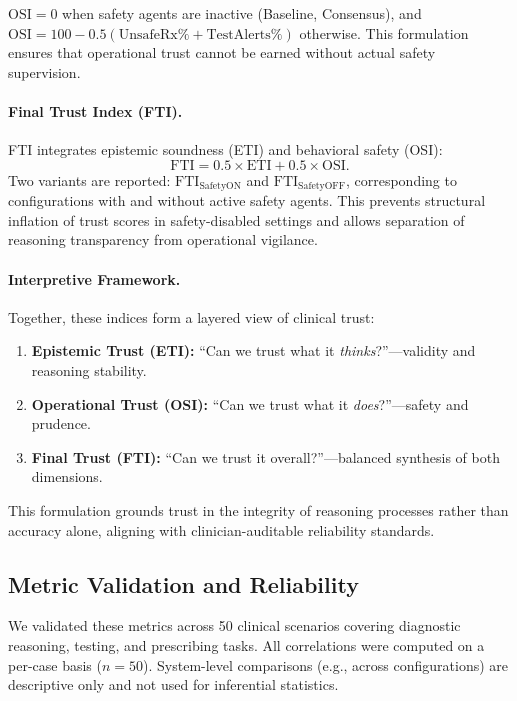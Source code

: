 \documentclass[letterpaper]{article} %
\begin{document}
$\mathrm{OSI}=0$ when safety agents are inactive (Baseline, Consensus),
and $\mathrm{OSI}=100 - 0.5(\text{UnsafeRx\%} + \text{TestAlerts\%})$ otherwise.
This formulation ensures that operational trust cannot be earned without actual safety supervision.


\paragraph{Final Trust Index (FTI).}
FTI integrates epistemic soundness (ETI) and behavioral safety (OSI):
\[
\mathrm{FTI} = 0.5 \times \mathrm{ETI} + 0.5 \times \mathrm{OSI}.
\]
Two variants are reported: $\mathrm{FTI}_{\text{SafetyON}}$ and $\mathrm{FTI}_{\text{SafetyOFF}}$, corresponding to configurations with and without active safety agents. 
This prevents structural inflation of trust scores in safety-disabled settings and allows separation of reasoning transparency from operational vigilance.

\paragraph{Interpretive Framework.}
Together, these indices form a layered view of clinical trust:
\begin{enumerate}
    \item \textbf{Epistemic Trust (ETI):} “Can we trust what it \textit{thinks}?”—validity and reasoning stability.
    \item \textbf{Operational Trust (OSI):} “Can we trust what it \textit{does}?”—safety and prudence.
    \item \textbf{Final Trust (FTI):} “Can we trust it overall?”—balanced synthesis of both dimensions.
\end{enumerate}
This formulation grounds trust in the integrity of reasoning processes rather than accuracy alone, aligning with clinician-auditable reliability standards.

\subsection{Metric Validation and Reliability}

We validated these metrics across 50 clinical scenarios covering diagnostic reasoning, testing, and prescribing tasks. 
All correlations were computed on a per-case basis ($n{=}50$). 
System-level comparisons (e.g., across configurations) are descriptive only and not used for inferential statistics.
\end{document}
